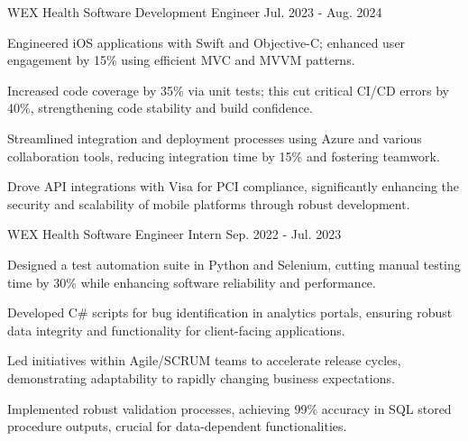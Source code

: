 


\begin{cventries}

        \cventry
          {WEX Health} %
          {Software Development Engineer} %
          {} %
          {Jul. 2023 - Aug. 2024} %
          {
            \begin{cvitems} %
            \item {Engineered iOS applications with Swift and Objective-C; enhanced user engagement by 15\% using efficient MVC and MVVM patterns.}
    \item {Increased code coverage by 35\% via unit tests; this cut critical CI/CD errors by 40\%, strengthening code stability and build confidence.}
    \item {Streamlined integration and deployment processes using Azure and various collaboration tools, reducing integration time by 15\% and fostering teamwork.}
    \item {Drove API integrations with Visa for PCI compliance, significantly enhancing the security and scalability of mobile platforms through robust development.}
            \end{cvitems}
          }

        \cventry
          {WEX Health} %
          {Software Engineer Intern} %
          {} %
          {Sep. 2022 - Jul. 2023} %
          {
            \begin{cvitems} %
            \item {Designed a test automation suite in Python and Selenium, cutting manual testing time by 30\% while enhancing software reliability and performance.}
    \item {Developed C\# scripts for bug identification in analytics portals, ensuring robust data integrity and functionality for client-facing applications.}
    \item {Led initiatives within Agile/SCRUM teams to accelerate release cycles, demonstrating adaptability to rapidly changing business expectations.}
    \item {Implemented robust validation processes, achieving 99\% accuracy in SQL stored procedure outputs, crucial for data-dependent functionalities.}
            \end{cvitems}
          }


\end{cventries}

